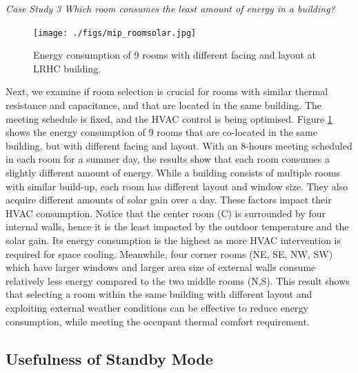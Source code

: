 \vspace{10px}
\emph{Case Study 3} \quad \textsl{Which room consumes the least amount of energy in a building?}
\vspace{10px}

\begin{figure}
	\centering
		\texttt{[image: ./figs/mip\_roomsolar.jpg]}		
	\caption{Energy consumption of 9 rooms with different facing and layout at LRHC building.}
	\label{fig:mip_rs}
\end{figure}

Next, we examine if room selection is crucial for rooms with similar thermal resistance and capacitance, and that are located in the same building. The meeting schedule is fixed, and the HVAC control is being optimised. Figure \ref{fig:mip_rs} shows the energy consumption of 9 rooms that are co-located in the same building, but with different facing and layout. With an 8-hours meeting scheduled in each room for a summer day, the results show that each room consumes a slightly different amount of energy. While a building consists of multiple rooms with similar build-up, each room has different layout and window size. They also acquire different amounts of solar gain over a day. These factors impact their HVAC consumption. Notice that the center room (C) is surrounded by four internal walls, hence it is the least impacted by the outdoor temperature and the solar gain. Its energy consumption is the highest as more HVAC intervention is required for space cooling. Meanwhile, four corner rooms (NE, SE, NW, SW) which have larger windows and larger area size of external walls consume relatively less energy compared to the two middle rooms (N,S). This result shows that selecting a room within the same building with different layout and exploiting external weather conditions can be effective to reduce energy consumption, while meeting the occupant thermal comfort requirement.

\subsection{Usefulness of Standby Mode}
\label{subsec:experiments:standby}

